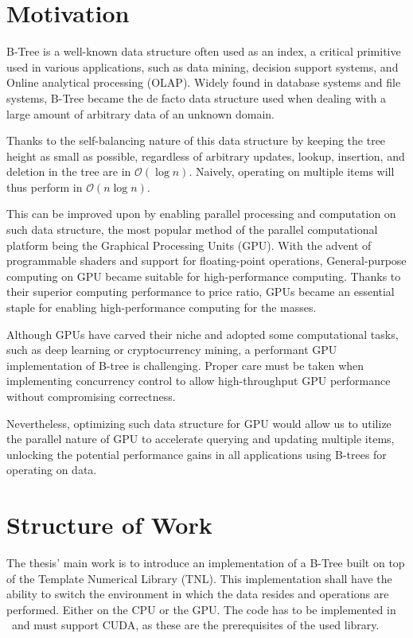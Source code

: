 \section{Motivation}

B-Tree is a well-known data structure often used as an index, a critical primitive used in various applications, such as data mining, decision support systems, and Online analytical processing (OLAP). Widely found in database systems and file systems, B-Tree became the de facto data structure used when dealing with a large amount of arbitrary data of an unknown domain.

Thanks to the self-balancing nature of this data structure by keeping the tree height as small as possible, regardless of arbitrary updates, lookup, insertion, and deletion in the tree are in $\mathcal{O}(\log{n})$. Naively, operating on multiple items will thus perform in $\mathcal{O}(n \log{n})$.

This can be improved upon by enabling parallel processing and computation on such data structure, the most popular method of the parallel computational platform being the Graphical Processing Units (GPU). With the advent of programmable shaders and support for floating-point operations, General-purpose computing on GPU became suitable for high-performance computing. Thanks to their superior computing performance to price ratio, GPUs became an essential staple for enabling high-performance computing for the masses.

Although GPUs have carved their niche and adopted some computational tasks, such as deep learning or cryptocurrency mining, a performant GPU implementation of B-tree is challenging. Proper care must be taken when implementing concurrency control to allow high-throughput GPU performance without compromising correctness.

Nevertheless, optimizing such data structure for GPU would allow us to utilize the parallel nature of GPU to accelerate querying and updating multiple items, unlocking the potential performance gains in all applications using B-trees for operating on data.

\section{Structure of Work}

The thesis' main work is to introduce an implementation of a B-Tree built on top of the Template Numerical Library (TNL). This implementation shall have the ability to switch the environment in which the data resides and operations are performed. Either on the CPU or the GPU. The code has to be implemented in \CC\ and must support CUDA, as these are the prerequisites of the used library.

